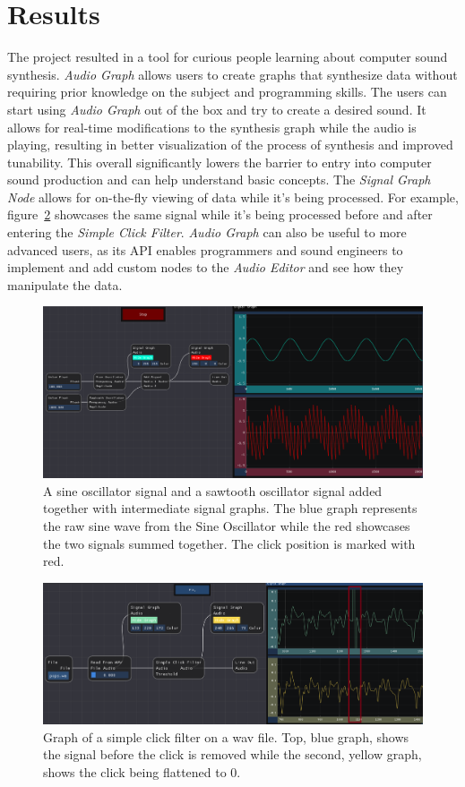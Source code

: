 \documentclass[conference]{IEEEtran}
\begin{document}
\section{Results}
The project resulted in a tool for curious people learning about computer sound synthesis. \textit{Audio Graph} allows users to create graphs that synthesize data without requiring prior knowledge on the subject and programming skills. The users can start using \textit{Audio Graph} out of the box and try to create a desired sound. It allows for real-time modifications to the synthesis graph while the audio is playing, resulting in better visualization of the process of synthesis and improved tunability. This overall significantly lowers the barrier to entry into computer sound production and can help understand basic concepts. The \textit{Signal Graph Node} allows for on-the-fly viewing of data while it's being processed. For example, figure~\ref{fig:simpleclicks} showcases the same signal while it's being processed before and after entering the \textit{Simple Click Filter}. \textit{Audio Graph} can also be useful to more advanced users, as its API enables programmers and sound engineers to implement and add custom nodes to the \textit{Audio Editor} and see how they manipulate the data.

\begin{figure}[btp]
    \centering
    \includegraphics[width=0.85\linewidth]{graphics/signalgraphnode.png}
    \caption{A sine oscillator signal and a sawtooth oscillator signal added together with intermediate signal graphs. The blue graph represents the raw sine wave from the Sine Oscillator while the red showcases the two signals summed together. The click position is marked with red.}
    \label{fig:signalgraphnode}
\end{figure}

\begin{figure}[btp]
    \centering
    \includegraphics[width=0.9\linewidth]{graphics/simpleclickfilter.png}
    \caption{Graph of a simple click filter on a wav file. Top, blue graph, shows the signal before the click is removed while the second, yellow graph, shows the click being flattened to 0.}
    \label{fig:simpleclicks}
\end{figure}
\end{document}
